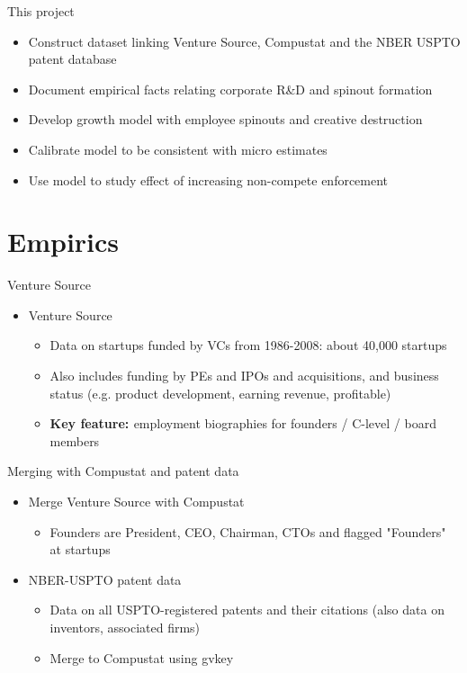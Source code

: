 \documentclass[english,usenames,dvipsnames]{beamer}
\begin{document}
\begin{frame}{This project}
\begin{itemize}
\item Construct dataset linking Venture Source, Compustat and the NBER USPTO patent database
\item Document empirical facts relating corporate R\&D and spinout formation
\item Develop growth model with employee spinouts and creative destruction
\item Calibrate model to be consistent with micro estimates
\item Use model to study effect of increasing non-compete enforcement
\end{itemize}
\end{frame}

\section{Empirics}

\begin{frame}
\tableofcontents[currentsection]
\end{frame}


\begin{frame}{Venture Source}
\begin{itemize}
\item Venture Source
\begin{itemize}
\item Data on startups funded by VCs from 1986-2008: about 40,000 startups
\item Also includes funding by PEs and IPOs and acquisitions, and business status (e.g. product development, earning revenue, profitable)
\item \textbf{\alert{Key feature: }} employment biographies for founders / C-level / board members \\
\end{itemize}
\end{itemize}
\end{frame}

\begin{frame}{Merging with Compustat and patent data}
\begin{itemize}
\item Merge Venture Source with Compustat
\begin{itemize}
\item Founders are President, CEO, Chairman, CTOs and flagged "Founders" at startups
\end{itemize}
\item NBER-USPTO patent data
\begin{itemize}
\item Data on all USPTO-registered patents and their citations (also data on inventors, associated firms)
\item Merge to Compustat using gvkey
\end{itemize}
\end{itemize}
\end{frame}
\end{document}

